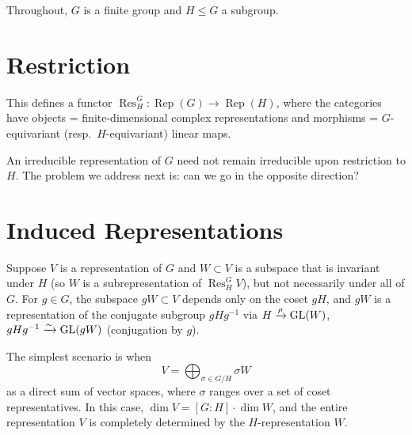 \documentclass{report}
\begin{document}

Throughout, \(G\) is a finite group and \(H \leq G\) a subgroup.

\section{Restriction}


This defines a functor \(\operatorname{Res}^G_H : \operatorname{Rep}(G) \to \operatorname{Rep}(H)\), where the categories have objects = finite-dimensional complex representations and morphisms = \(G\)-equivariant (resp.\ \(H\)-equivariant) linear maps.

An irreducible representation of \(G\) need not remain irreducible upon restriction to \(H\). The problem we address next is: can we go in the opposite direction?


\section{Induced Representations}

Suppose \(V\) is a representation of \(G\) and \(W \subset V\) is a subspace that is invariant under \(H\) (so \(W\) is a subrepresentation of \(\operatorname{Res}^G_H V\)), but not necessarily under all of \(G\). For \(g \in G\), the subspace \(gW \subset V\) depends only on the coset \(gH\), and \(gW\) is a representation of the conjugate subgroup \(gHg^{-1}\) via \(H \xrightarrow{\rho} \operatorname{GL}(W)\), \(gHg^{-1} \xrightarrow{\sim} \operatorname{GL}(gW)\) (conjugation by \(g\)).

The simplest scenario is when
\[V = \bigoplus_{\sigma \in G/H} \sigma W\]
as a direct sum of vector spaces, where \(\sigma\) ranges over a set of coset representatives. In this case, \(\dim V = [G:H] \cdot \dim W\), and the entire representation \(V\) is completely determined by the \(H\)-representation \(W\).

\end{document}
